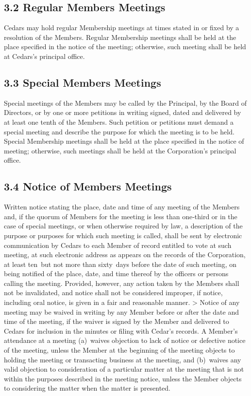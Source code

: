 \documentclass[
]{book}
\begin{document}
\subsection{3.2 Regular Members Meetings}\label{regular-members-meetings}

Cedars may hold regular Membership meetings at times stated in or
fixed by a resolution of the Members. Regular Membership meetings
shall be held at the place specified in the notice of the meeting;
otherwise, such meeting shall be held at Cedars's principal office.

\subsection{3.3 Special Members Meetings}\label{special-members-meetings}

Special meetings of the Members may be called by the Principal, by the
Board of Directors, or by one or more petitions in writing signed,
dated and delivered by at least one tenth of the Members. Such
petition or petitions must demand a special meeting and describe the
purpose for which the meeting is to be held. Special Membership
meetings shall be held at the place specified in the notice of
meeting; otherwise, such meetings shall be held at the Corporation's
principal office.

\subsection{3.4 Notice of Members Meetings}\label{notice-of-members-meetings}

Written notice stating the place, date and time of any meeting of the
Members and, if the quorum of Members for the meeting is less than
one‑third or in the case of special meetings, or when otherwise
required by law, a description of the purpose or purposes for which
such meeting is called, shall be sent by electronic communication by
Cedars to each Member of record entitled to vote at such meeting, at
such electronic address as appears on the records of the Corporation,
at least ten~but not more than sixty~days before the date of such
meeting, on being notified of the place, date, and time thereof by the
officers or persons calling the meeting. Provided, however, any action
taken by the Members shall not be invalidated, and notice shall not be
considered improper, if notice, including oral notice, is given in a
fair and reasonable manner.
\textgreater{}
Notice of any meeting may be waived in writing by any Member before or
after the date and time of the meeting, if the waiver is signed by the
Member and delivered to Cedars for inclusion in the minutes or filing
with Cedar's records. A Member's attendance at a meeting (a)~waives
objection to lack of notice or defective notice of the meeting, unless
the Member at the beginning of the meeting objects to holding the
meeting or transacting business at the meeting, and (b)~waives any
valid objection to consideration of a particular matter at the meeting
that is not within the purposes described in the meeting notice,
unless the Member objects to considering the matter when the matter is
presented.
\end{document}
